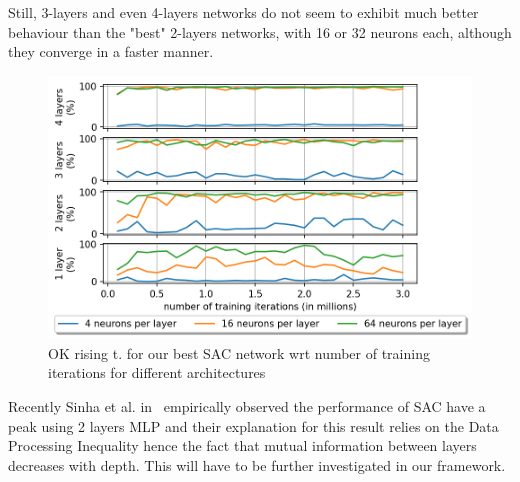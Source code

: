 \documentclass[anonymous=true,format=sigconf, screen=true, review=false]{acmart}
\begin{document}
Still, 3-layers and even 4-layers networks do not seem to exhibit much better behaviour than the "best" 2-layers networks, with 16 or 32 neurons each, although they converge in a faster manner. %
\begin{figure}
\centering
\includegraphics[width=\linewidth]{OK_rising_time_sac_architecture_iterations_new.png}
\caption{OK rising t. for our best SAC network wrt number of training iterations for different architectures}
\label{fig:architectures-iterations}
\end{figure}
Recently Sinha et al. in~\cite{sinha2020d2rl} empirically observed the performance of SAC have a peak using 2 layers MLP and their explanation for this result relies on the Data Processing Inequality hence the fact that mutual information between layers decreases with depth. This will have to be further investigated in our framework. 
\end{document}

